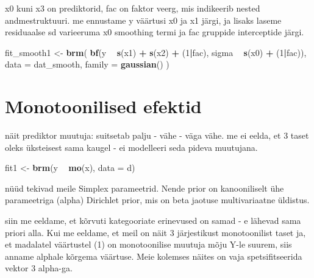 \documentclass[]{book}
\newenvironment{Shaded}{\begin{snugshade}}{\end{snugshade}}
\newcommand{\DataTypeTok}[1]{\textcolor[rgb]{0.13,0.29,0.53}{#1}}
\newcommand{\DecValTok}[1]{\textcolor[rgb]{0.00,0.00,0.81}{#1}}
\newcommand{\KeywordTok}[1]{\textcolor[rgb]{0.13,0.29,0.53}{\textbf{#1}}}
\newcommand{\NormalTok}[1]{#1}
\newcommand{\OperatorTok}[1]{\textcolor[rgb]{0.81,0.36,0.00}{\textbf{#1}}}
\newcommand{\StringTok}[1]{\textcolor[rgb]{0.31,0.60,0.02}{#1}}
\begin{document}
x0 kuni x3 on prediktorid, fac on faktor veerg, mis indikeerib nested andmestruktuuri. me ennustame y väärtusi x0 ja x1 järgi, ja lisaks laseme residuaalse sd varieeruma x0 smoothing termi ja fac gruppide interceptide järgi.

\begin{Shaded}
\begin{Highlighting}[]
\NormalTok{fit_smooth1 <-}\StringTok{ }\KeywordTok{brm}\NormalTok{(}
  \KeywordTok{bf}\NormalTok{(y }\OperatorTok{~}\StringTok{ }\KeywordTok{s}\NormalTok{(x1) }\OperatorTok{+}\StringTok{ }\KeywordTok{s}\NormalTok{(x2) }\OperatorTok{+}\StringTok{ }\NormalTok{(}\DecValTok{1}\OperatorTok{|}\NormalTok{fac), sigma }\OperatorTok{~}\StringTok{ }\KeywordTok{s}\NormalTok{(x0) }\OperatorTok{+}\StringTok{ }\NormalTok{(}\DecValTok{1}\OperatorTok{|}\NormalTok{fac)),}
  \DataTypeTok{data =}\NormalTok{ dat_smooth, }\DataTypeTok{family =} \KeywordTok{gaussian}\NormalTok{()}
\NormalTok{)}
\end{Highlighting}
\end{Shaded}

\hypertarget{monotoonilised-efektid}{%
\section{Monotoonilised efektid}\label{monotoonilised-efektid}}

näit prediktor muutuja: suitsetab palju - vähe - väga vähe.
me ei eelda, et 3 taset oleks üksteisest sama kaugel - ei modelleeri seda pideva muutujana.

\begin{Shaded}
\begin{Highlighting}[]
\NormalTok{fit1 <-}\StringTok{ }\KeywordTok{brm}\NormalTok{(y }\OperatorTok{~}\StringTok{ }\KeywordTok{mo}\NormalTok{(x), }\DataTypeTok{data =}\NormalTok{ d)}
\end{Highlighting}
\end{Shaded}

nüüd tekivad meile Simplex parameetrid. Nende prior on kanooniliselt ühe parameetriga (alpha) Dirichlet prior, mis on beta jaotuse multivariaatne üldistus.

siin me eeldame, et kõrvuti kategooriate erinevused on samad - e lähevad sama priori alla. Kui me eeldame, et meil on näit 3 järjestikust monotoonilist taset ja, et madalatel väärtustel (1) on monotoonilise muutuja mõju Y-le suurem, siis anname alphale kõrgema väärtuse. Meie kolemses näites on vaja spetsifitseerida vektor 3 alpha-ga.
\end{document}
